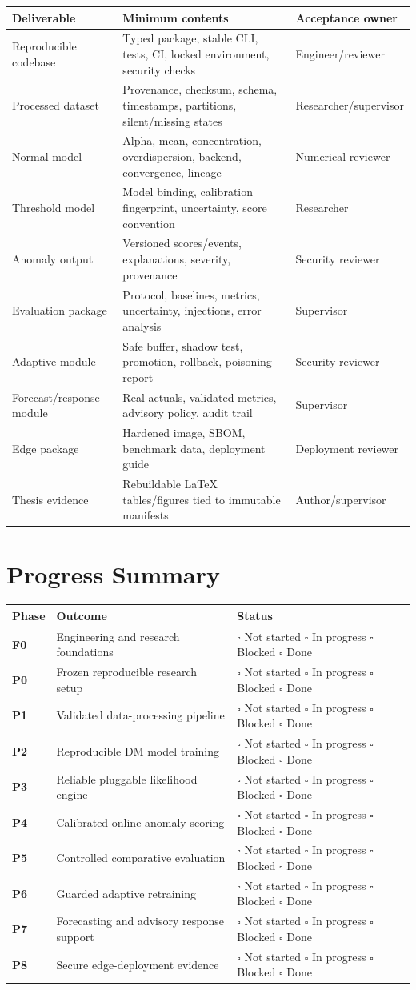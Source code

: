 \documentclass[11pt,a4paper]{article}
\newcommand{\status}{\(\square\) Not started \quad \(\square\) In progress \quad \(\square\) Blocked \quad \(\square\) Done}
\begin{document}
\begin{longtable}{p{}p{}p{}}
\toprule
Deliverable & Minimum contents & Acceptance owner \\
\midrule
\endhead
Reproducible codebase & Typed package, stable CLI, tests, CI, locked environment, security checks & Engineer/reviewer \\
Processed dataset & Provenance, checksum, schema, timestamps, partitions, silent/missing states & Researcher/supervisor \\
Normal model & Alpha, mean, concentration, overdispersion, backend, convergence, lineage & Numerical reviewer \\
Threshold model & Model binding, calibration fingerprint, uncertainty, score convention & Researcher \\
Anomaly output & Versioned scores/events, explanations, severity, provenance & Security reviewer \\
Evaluation package & Protocol, baselines, metrics, uncertainty, injections, error analysis & Supervisor \\
Adaptive module & Safe buffer, shadow test, promotion, rollback, poisoning report & Security reviewer \\
Forecast/response module & Real actuals, validated metrics, advisory policy, audit trail & Supervisor \\
Edge package & Hardened image, SBOM, benchmark data, deployment guide & Deployment reviewer \\
Thesis evidence & Rebuildable LaTeX tables/figures tied to immutable manifests & Author/supervisor \\
\bottomrule
\end{longtable}

\section{Progress Summary}

\begin{longtable}{>{\bfseries}p{}p{}p{}}
\toprule
Phase & Outcome & Status \\
\midrule
\endhead
F0 & Engineering and research foundations & \status \\
P0 & Frozen reproducible research setup & \status \\
P1 & Validated data-processing pipeline & \status \\
P2 & Reproducible DM model training & \status \\
P3 & Reliable pluggable likelihood engine & \status \\
P4 & Calibrated online anomaly scoring & \status \\
P5 & Controlled comparative evaluation & \status \\
P6 & Guarded adaptive retraining & \status \\
P7 & Forecasting and advisory response support & \status \\
P8 & Secure edge-deployment evidence & \status \\
\bottomrule
\end{longtable}
\end{document}
